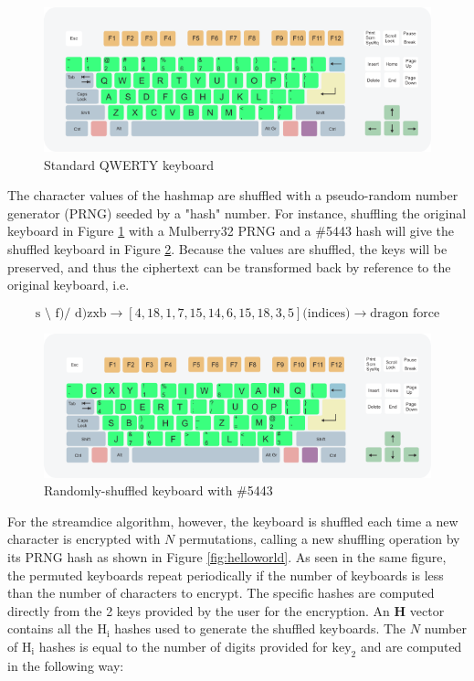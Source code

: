 \documentclass{article}
\begin{document}
\begin{figure}[h]
  \centering
  \includegraphics[width=0.7\linewidth]{img/qwerty.png}
  \caption{Standard QWERTY keyboard}
  \label{fig:keyboard}
\end{figure}

The character values of the hashmap are shuffled with a pseudo-random number generator (PRNG) seeded by a "hash" number. 
For instance, shuffling the original keyboard in Figure \ref{fig:keyboard} with a Mulberry32 PRNG and a \#5443 hash will give the shuffled
keyboard in Figure \ref{fig:hash}. 
Because the values are shuffled, the keys will be preserved, and thus the ciphertext can be transformed back by reference to the original keyboard, i.e.

\[
  \text{s \^\ f)/  d)zxb} \rightarrow [4,18,1,7,15,14,6,15,18,3,5] \text{(indices)} \rightarrow \text{dragon force}
\]

\begin{figure}[h]
  \centering
  \includegraphics[width=0.7\linewidth]{img/qwerty_shuffled.png}
  \caption{Randomly-shuffled keyboard with \#5443}
  \label{fig:hash}
\end{figure}

For the streamdice algorithm, however, the keyboard is shuffled each time a new character is encrypted with $N$ permutations, 
calling a new shuffling operation by its PRNG hash as shown in Figure \ref{fig:helloworld}. As seen in the same figure, the permuted keyboards repeat periodically if the number of keyboards is less than the number of characters to encrypt. The specific hashes are computed directly from the 2 keys provided by the user for the encryption. An $\mathbf{H}$ vector contains all the $\mathrm{H_i}$ hashes used to generate the shuffled keyboards. The $N$ number of $\mathrm{H_i}$ hashes is equal to the number of digits provided for $\mathrm{key_2}$ and are computed in the following way:
\end{document}
